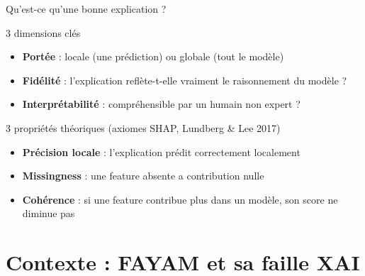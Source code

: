 \documentclass[10pt]{beamer}
\begin{document}
\begin{frame}{Qu'est-ce qu'une bonne explication ?}
  \begin{block}{3 dimensions clés}
    \begin{itemize}
      \item \textbf{Portée} : locale (une prédiction) ou globale (tout le modèle)
      \item \textbf{Fidélité} : l'explication reflète-t-elle vraiment le raisonnement du modèle ?
      \item \textbf{Interprétabilité} : compréhensible par un humain non expert ?
    \end{itemize}
  \end{block}

  \vspace{6pt}

  \begin{exampleblock}{3 propriétés théoriques (axiomes SHAP, Lundberg \& Lee 2017)}
    \begin{itemize}
      \item \textbf{Précision locale} : l'explication prédit correctement localement
      \item \textbf{Missingness} : une feature absente a contribution nulle
      \item \textbf{Cohérence} : si une feature contribue plus dans un modèle,
            son score ne diminue pas
    \end{itemize}
  \end{exampleblock}
\end{frame}

\section{Contexte : FAYAM et sa faille XAI}
\end{document}
